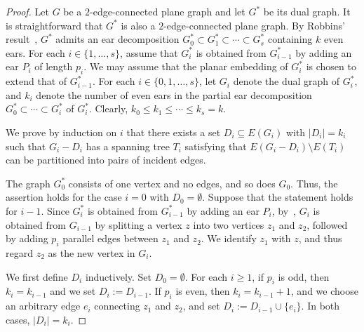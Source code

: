 \documentclass[a4paper,12pt]{article}
\theoremstyle{plain}
\theoremstyle{definition}
\theoremstyle{remark}
\numberwithin{equation}{section}
\begin{document}
\begin{proof}
Let $G$ be a $2$-edge-connected plane graph and let $G^*$ be its dual graph. It is straightforward that $G^*$ is also a $2$-edge-connected plane graph. By Robbins' result~\cite{R1939}, $G^*$ admits an ear decomposition $G^*_0\subset G^*_1\subset\cdots \subset G^*_s$ containing $k$ even ears. For each $i\in \{1,\ldots, s\}$, assume that $G^*_i$ is obtained from $G^*_{i-1}$ by adding an ear $P_i$ of length $p_i$. We may assume that the planar embedding of $G_i^*$ is chosen to extend that of $G^*_{i-1}$. For each $i\in \{0,1,\ldots, s\}$, let $G_i$ denote the dual graph of $G^*_i$, and $k_i$ denote the number of even ears in the partial ear decomposition $G^*_0\subset \cdots \subset G^*_i$ of $G^*_i$. Clearly, $k_0\leq k_1\leq \cdots \leq k_s=k$.

We prove by induction on $i$ that there exists a set $D_i\subseteq E(G_i)$ with $|D_i|=k_i$ such that $G_i-D_i$ has a spanning tree $T_i$ satisfying that
$E(G_i-D_i)\setminus E(T_i)$ can be partitioned into pairs of incident edges.

The graph $G^*_0$ consists of one vertex and no edges, and so does $G_0$. Thus, the assertion holds for the case $i=0$ with $D_0=\emptyset$. Suppose that the statement holds for $i-1$. Since $G^*_i$ is obtained from $G^*_{i-1}$ by adding an ear $P_i$, by~, $G_i$ is obtained from $G_{i-1}$ by splitting a vertex $z$ into two vertices $z_1$ and $z_2$, followed by adding $p_i$ parallel edges between $z_1$ and $z_2$. We identify $z_1$ with $z$, and thus regard $z_2$ as the new vertex in $G_i$. 




We first define $D_i$ inductively. Set $D_0=\emptyset$. For each $i\ge 1$, if $p_i$ is odd, then $k_i=k_{i-1}$ and we set
$D_i:=D_{i-1}$. If $p_i$ is even, then $k_i=k_{i-1}+1$, and we choose an arbitrary edge $e_i$ connecting $z_1$ and $z_2$, and set $D_i:=D_{i-1}\cup\{e_i\}$. In both cases, $|D_i|=k_i$.


\end{proof}
\end{document}
